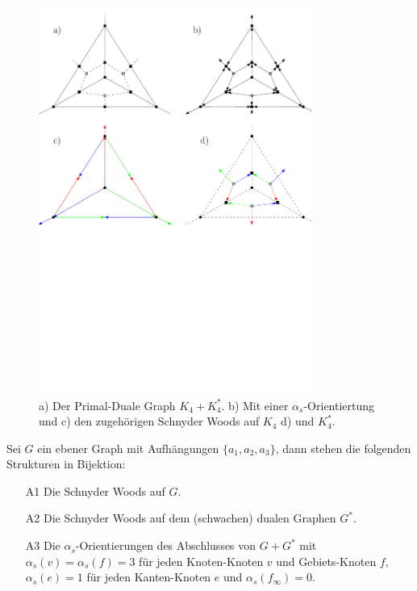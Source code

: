 \begin{figure}
	\centering
	\includegraphics[width=0.8\textwidth]{alpha_ex.pdf}
  \caption{a) Der Primal-Duale Graph $K_4+K_4^*$. b) Mit einer $\alpha_s$-Orientiertung und c) den zugehörigen Schnyder Woods auf $K_4$ d) und $K^*_4$. }
  \label{alpha_ex}
\end{figure}

\begin{theorem}\label{alpha_bij}
Sei $G$ ein ebener Graph mit Aufhängungen $\{a_1,a_2,a_3\}$, dann stehen die folgenden Strukturen in Bijektion:
\begin{itemize}
\item [A1] Die Schnyder Woods auf $G$.
\item [A2] Die Schnyder Woods auf dem (schwachen) dualen Graphen $G^*$.
\item [A3] Die $\alpha_{s}$-Orientierungen des Abschlusses von $G+G^*$ mit $\alpha_s(v) = \alpha_s(f) = 3$ für jeden Knoten-Knoten $v$ und Gebiets-Knoten $f$,  $\alpha_s(e) = 1$ für jeden Kanten-Knoten $e$ und  $\alpha_s(f_\infty) = 0$.
\end{itemize}
\end{theorem}

